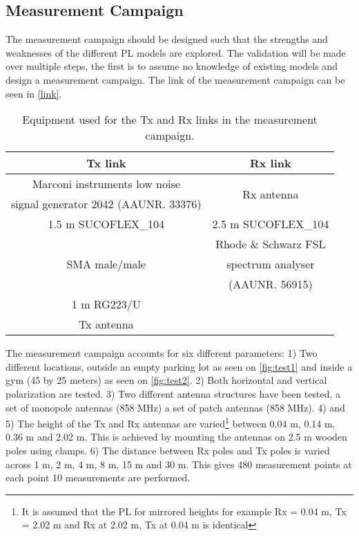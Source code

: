 
\subsection{Measurement Campaign}


The measurement campaign should be designed such that the strengths and weaknesses of the different PL models are explored. 
The validation will be made over multiple steps, the first is to assume no knowledge of existing models and design a measurement campaign. The link of the measurement campaign can be seen in \autoref{link}. 

\begin{table}[!htbp]
\centering
\begin{tabular}{|c|c|}\hline
\textbf{Tx link}&\textbf{Rx link}\\\hline
Marconi instruments low noise & \multirow{2}{*}{Rx antenna} \\
signal generator 2042 (AAUNR. 33376) & \\\hline
1.5 m SUCOFLEX\_104 & 2.5 m SUCOFLEX\_104 \\\hline 
\multirow{3}{*}{SMA male/male} & Rhode \& Schwarz FSL \\
&spectrum analyser \\
& (AAUNR. 56915)\\\hline
1 m RG223/U & \\\hline
Tx antenna &\\\hline
\end{tabular}
\caption{Equipment used for the Tx and Rx links in the measurement campaign.}
\label{link}
\end{table}
The measurement campaign accounts for six different parameters: 1) Two different locations, outside an empty parking lot as seen on \autoref{fig:test1} and inside a gym (45 by 25 meters) as seen on \autoref{fig:test2}. 2) Both horizontal and vertical polarization are tested. 3) Two different antenna structures have been tested, a set of monopole antennas (858 MHz) a set of patch antennas (858 MHz). 4) and 5) The height of the Tx and Rx antennas are varied\footnote{It is assumed that the PL for mirrored heights for example Rx = 0.04 m, Tx = 2.02 m and Rx at 2.02 m, Tx at 0.04 m is identical} between 0.04 m, 0.14 m, 0.36 m and 2.02 m. This is achieved by mounting the antennas on 2.5 m wooden poles using clamps. 6) The distance between Rx poles and Tx poles is varied across 1 m, 2 m, 4 m, 8 m, 15 m and 30 m. This gives 480 measurement points at each point 10 measurements are performed.

